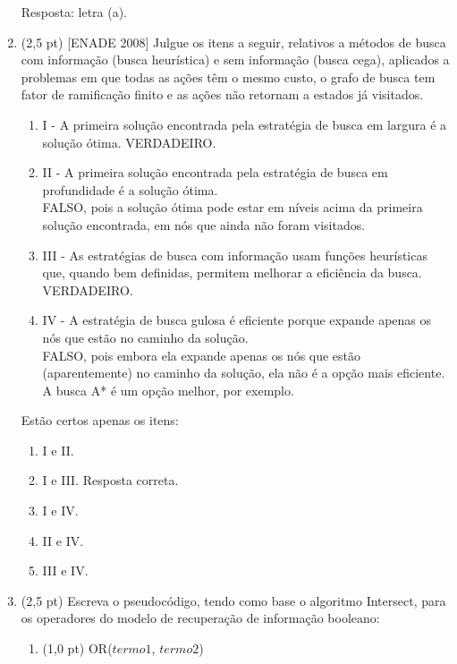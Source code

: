 \documentclass[12pt,a4paper,oneside]{article}
\begin{document}
\begin{enumerate}
{		\vspace*{0.3cm}
		
		Resposta: letra (a).
		 
	}	

	\newpage
	
	\item (2,5 pt) [ENADE 2008] Julgue os itens a seguir, relativos a métodos de busca com informação (busca heurística) e sem informação (busca cega), aplicados a problemas em que todas as ações têm o mesmo custo, o grafo de busca tem fator de ramificação finito e as ações não retornam a estados já visitados.
	
	\begin{enumerate}
		\item[] I - A primeira solução encontrada pela estratégia de busca em largura é a solução ótima. 
		{\color{blue} VERDADEIRO. }
		\item[] II - A primeira solução encontrada pela estratégia de busca em profundidade é a solução ótima. \\
		{\color{blue} FALSO, pois a solução ótima pode estar em níveis acima da primeira solução encontrada, em nós que ainda não foram visitados.}
		\item[] III - As estratégias de busca com informação usam funções heurísticas que, quando bem definidas, permitem
		melhorar a eficiência da busca. {\color{blue} VERDADEIRO. }
		\item[] IV - A estratégia de busca gulosa é eficiente porque expande apenas os nós que estão no caminho da
		solução.\\
		{\color{blue} FALSO, pois embora ela expande apenas os nós que estão (aparentemente) no caminho da solução, ela não é a opção mais eficiente. A busca A* é um opção melhor, por exemplo.}
	\end{enumerate}
	
	Estão certos apenas os itens:
	
	\begin{enumerate}
		\item I e II.
		\item I e III. {\color{blue} Resposta correta.}
		\item I e IV.
		\item II e IV.
		\item III e IV.
	\end{enumerate}

	\newpage

	\item (2,5 pt) Escreva o pseudocódigo, tendo como base o algoritmo {\sc Intersect}, para os operadores do modelo de recuperação de informação booleano:
	\begin{enumerate}
		\item (1,0 pt) {\sc OR}($termo1$, $termo2$)
		{\color{blue}
			
}
\end{enumerate}
\end{enumerate}
\end{document}

